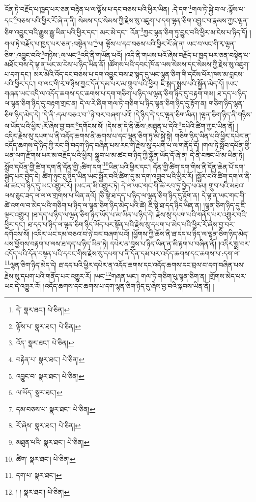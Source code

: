 འོན་ཏེ་བརྗོད་པ་ཁྱད་པར་ཅན་བརྟེན་པ་ལ་ལྟོས་པ་དང་བཅས་པའི་ཕྱིར་ཡིན། :དེ་དག་\footnote{དེ་  སྣར་ཐང་།  པེ་ཅིན། }གལ་ཏེ་སྐྱེ་བ་ལ་:ལྟོས་པ་དང་\footnote{ལྟོས་པ་  སྣར་ཐང་།  པེ་ཅིན། }བཅས་པའི་ཕྱིར་རོ་ཞེ་ན་ནི། སེམས་དང་སེམས་ཀྱི་རྗེས་སུ་འཇུག་པ་དག་ལྷན་ཅིག་འབྱུང་བ་རྣམས་ཀྱང་ལྷན་ཅིག་འབྱུང་བའི་རྒྱུས་རྒྱུ་ཡིན་པའི་ཕྱིར་དང་། མར་མེ་དང་། འོན་\footnote{འོད་  སྣར་ཐང་།  པེ་ཅིན། }ཀྱང་ལྷན་ཅིག་ཏུ་བྱུང་བའི་ཕྱིར་མ་ངེས་པ་ཉིད་དོ། །གལ་ཏེ་བརྗོད་པ་ཁྱད་པར་ཅན་:བསྟེན་པ་\footnote{བརྟེན་པ་  སྣར་ཐང་།  པེ་ཅིན། }ལ། ལྟོས་པ་དང་བཅས་པའི་ཕྱིར་རོ་ཞེ་ན། ཡང་བ་ལང་གི་རྭ་ལྷན་ཅིག་:འབྱུང་བའི་\footnote{འབྱུང་བ་  སྣར་ཐང་།  པེ་ཅིན། }གཉིས་:ལ་ཡང་\footnote{ལ་ཡོད་  སྣར་ཐང་། }འདི་ནི་གཡོན་པའོ། །འདི་ནི་གཡས་པའོ་ཞེས་བརྗོད་པ་ཁྱད་པར་ཅན་བསྟེན་པ་མཐོང་བས་དེ་ལྟ་ན་ཡང་མ་ངེས་པ་ཉིད་ཡིན་ནོ། །ཚོགས་པའི་དབང་ཁོ་ན་ལས་སེམས་དང་སེམས་ཀྱི་རྗེས་སུ་འཇུག་པ་དག་དང་། མར་མེའི་འོད་དང་བཅས་པ་དག་འབྱུང་བས་ཐ་སྙད་དུ་ཡང་ལྷན་ཅིག་གི་དངོས་པོར་ཁས་མ་བླངས་པའི་ཕྱིར་དང་། བ་ལང་གི་རྭ་གཉིས་ཀྱང་དོན་དམ་པར་མ་གྲུབ་པའི་ཕྱིར། ཇི་སྐད་སྨྲས་པའི་སྐྱོན་མེད་དོ། །ཡང་གཞན་ཡང་འདི་ལ་འདོད་ཆགས་དང་ཆགས་པ་དག་གཅིག་པ་ཉིད་ལ་ལྷན་ཅིག་ཉིད་དུ་བརྟག་གམ། ཐ་དད་པ་ཉིད་ལ་ལྷན་ཅིག་ཉིད་དུ་བརྟག་གྲང་ན། དེ་ལ་རེ་ཞིག་གལ་ཏེ་གཅིག་པ་ཉིད་ལྷན་ཅིག་ཉིད་དུ་རྟོག་ན། གཅིག་ཉིད་ལྷན་ཅིག་ཉིད་མེད་དེ། །དེ་ནི་:དམ་བཅའ་བ་\footnote{དམ་བཅས་པ་  སྣར་ཐང་།  པེ་ཅིན། }ཉེ་བར་བཞག་པའོ། །དེ་ཉིད་དེ་དང་ལྷན་ཅིག་མིན། །ལྷན་ཅིག་ཉིད་ནི་གཉིས་ལ་ཡོད་པའི་ཕྱིར་:རོ་ཞེས་བྱ་བར་\footnote{རོ་ཞེས་  སྣར་ཐང་།  པེ་ཅིན། }དགོངས་སོ། །དེས་ན་དེ་ནི་ཆོས་:མཐུན་པ་དེའི་\footnote{མཐུན་པའི་  སྣར་ཐང་།  པེ་ཅིན། }དཔེའི་ཚིག་ཀྱང་ཡིན་ནོ། །འདིར་རྗེས་སུ་དཔག་པ་ནི་འདོད་ཆགས་ནི་ཆགས་པ་དང་ལྷན་ཅིག་ཏུ་མི་སྐྱེ་སྟེ། གཅིག་ཉིད་ཡིན་པའི་ཕྱིར་དཔེར་ན་འདོད་ཆགས་དེ་ཉིད་ཀྱི་རང་གི་བདག་ཉིད་བཞིན་པས་རང་གི་རྗེས་སུ་དཔག་པ་ལ་གནོད་དོ། །གལ་ཏེ་སློབ་དཔོན་གྱི་ཡན་ལག་རྫོགས་པར་མ་བརྗོད་པའི་ཕྱིར། སྒྲུབ་པ་མ་ཚང་བ་ཉིད་ཀྱི་སྐྱོན་ཡོད་དོ་ཞེ་ན། དེ་ནི་བཟང་པོ་མ་ཡིན་ཏེ། སློབ་དཔོན་གྱི་ཚིག་དག་ནི་དོན་གྱི་:ཚིག་དག་\footnote{ཚིག་  སྣར་ཐང་།  པེ་ཅིན། }ཡིན་པའི་ཕྱིར་དང་། དོན་གྱི་ཚིག་དག་གིས་ནི་དོན་ཆེན་པོ་དག་སྐྱེད་པར་བྱེད་དེ། ཚིག་ཉུང་ངུ་ཉིད་ཡིན་ཡང་སྦྱོར་བའི་ཚིག་དུ་མ་དག་འགྲུབ་པའི་ཕྱིར་རོ། །སྦྱོར་བའི་ཚིག་དག་ལ་ནི་མ་ཚང་བ་ཉིད་དུ་ཡང་འགྱུར་རོ། །ཡང་ན་མི་འགྱུར་ཏེ། དེ་ལ་ཡང་གང་གི་ཚེ་རབ་ཏུ་བྱེད་པའམ། གྲུབ་པའི་མཐའ་ལས་ཅུང་ཟད་ལ་ལ་ལ་གྲགས་པ་ཡིན་ནའོ། །ཅི་སྟེ་ཐ་དད་པ་ཉིད་ལ་ལྷན་ཅིག་ཉིད་དུ་རྟོག་ན། དེ་ལྟ་ན་ཡང་གང་གི་ཚེ་འགལ་བ་མེད་པའི་གཅིག་པ་ཉིད་ལ་ལྷན་ཅིག་ཉིད་མེད་པའི་ཚེ། ཇི་སྟེ་ཐ་དད་ཉིད་ཡིན་ན། །ལྷན་ཅིག་ཉིད་དུ་ཇི་ལྟར་འགྱུར། །ཐ་དད་པ་ཉིད་ལ་ལྷན་ཅིག་ཉིད་ཡོད་པ་མ་ཡིན་པ་ཉིད་དེ། རྗེས་སུ་དཔག་པའི་གནོད་པར་འགྱུར་བའི་ཕྱིར་དང་། ཐ་དད་པ་ཉིད་ལ་ལྷན་ཅིག་ཉིད་ཡོད་པར་སྟོན་པའི་རྗེས་སུ་དཔག་པ་མེད་པའི་ཕྱིར་རོ་ཞེས་བྱ་བར་དགོངས་སོ། །འདིར་ཡང་དམ་བཅའ་བ་ཉེ་བར་བཞག་པའོ། །ཕྱོགས་ཀྱི་ཆོས་ནི་ཐ་དད་པ་ཉིད་ལ་ལྷན་ཅིག་ཉིད་མེད་པས་ཕྱོགས་བརྟག་པ་ལས་ཐ་དད་པ་ཉིད་ཡིན་ཏེ། དཔེར་ན་བྱས་པ་ཉིད་ཡིན་ན་མི་རྟག་པ་བཞིན་ནོ། །འདིར་སྨྲ་བར་འདོད་པའི་དོན་བསྟན་པའི་དབང་གིས་རྗེས་སུ་དཔག་པ་ནི་དོན་དམ་པར་འདོད་ཆགས་དང་ཆགས་པ་:དག་ལ་\footnote{དག་པ་  སྣར་ཐང་། }ལྷན་ཅིག་ཉིད་མེད་དེ། ཐ་དད་པའི་ཕྱིར་དཔེར་ན་འདོད་ཆགས་དང་འདོད་ཆགས་དང་བྲལ་བ་དག་བཞིན་པས་རྗེས་སུ་དཔག་པའི་གནོད་པར་འགྱུར་རོ། །ཡང་\footnote{། །  སྣར་ཐང་།  པེ་ཅིན། }གཞན་ཡང་། གལ་ཏེ་གཅིག་པུ་ལྷན་ཅིག་ན། །གྲོགས་མེད་པར་ཡང་དེ་འགྱུར་རོ། །འདོད་ཆགས་དང་ཆགས་པ་དག་ལྷན་ཅིག་ཉིད་དུ་ཞེས་བྱ་བའི་སྐབས་ཡིན་ནོ། །
